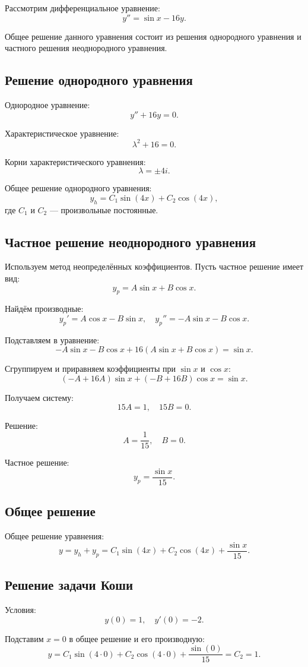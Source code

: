 \documentclass[a4paper,12pt]{article}
\begin{document}
Рассмотрим дифференциальное уравнение:
\[
y'' = \sin x - 16y.
\]

Общее решение данного уравнения состоит из решения однородного уравнения и частного решения неоднородного уравнения.

\subsection*{Решение однородного уравнения}
Однородное уравнение:
\[
y'' + 16y = 0.
\]

Характеристическое уравнение:
\[
\lambda^2 + 16 = 0.
\]

Корни характеристического уравнения:
\[
\lambda = \pm 4i.
\]

Общее решение однородного уравнения:
\[
y_h = C_1 \sin(4x) + C_2 \cos(4x),
\]
где \( C_1 \) и \( C_2 \) — произвольные постоянные.

\subsection*{Частное решение неоднородного уравнения}
Используем метод неопределённых коэффициентов. Пусть частное решение имеет вид:
\[
y_p = A \sin x + B \cos x.
\]

Найдём производные:
\[
y_p' = A \cos x - B \sin x, \quad y_p'' = -A \sin x - B \cos x.
\]

Подставляем в уравнение:
\[
-A \sin x - B \cos x + 16(A \sin x + B \cos x) = \sin x.
\]

Сгруппируем и приравняем коэффициенты при \(\sin x\) и \(\cos x\):
\[
(-A + 16A) \sin x + (-B + 16B) \cos x = \sin x.
\]

Получаем систему:
\[
15A = 1, \quad 15B = 0.
\]

Решение:
\[
A = \frac{1}{15}, \quad B = 0.
\]

Частное решение:
\[
y_p = \frac{\sin x}{15}.
\]

\subsection*{Общее решение}
Общее решение уравнения:
\[
y = y_h + y_p = C_1 \sin(4x) + C_2 \cos(4x) + \frac{\sin x}{15}.
\]

\subsection*{Решение задачи Коши}
Условия:
\[
y(0) = 1, \quad y'(0) = -2.
\]

Подставим \(x = 0\) в общее решение и его производную:
\[
y = C_1 \sin(4 \cdot 0) + C_2 \cos(4 \cdot 0) + \frac{\sin(0)}{15} = C_2 = 1.
\]
\end{document}
